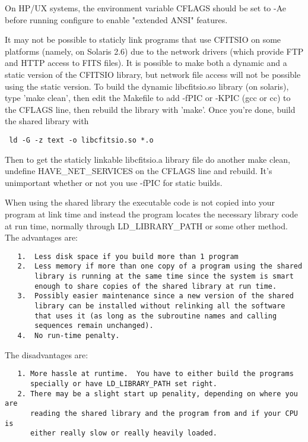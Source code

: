 \documentclass[11pt]{book}
\begin{document}
On HP/UX systems, the environment variable CFLAGS should be set
to -Ae before running configure to enable "extended ANSI" features.

It may not be possible to staticly link programs that use CFITSIO on
some platforms (namely, on Solaris 2.6) due to the network drivers
(which provide FTP and HTTP access to FITS files).  It is possible to
make both a dynamic and a static version of the CFITSIO library, but
network file access will not be possible using the static version.  To
build the dynamic libcfitsio.so library (on solaris), type 'make
clean', then edit the Makefile to add -fPIC or -KPIC (gcc or cc) to the
CFLAGS line, then rebuild the library with 'make'.  Once you're done,
build the shared library with

\begin{verbatim}
 ld -G -z text -o libcfitsio.so *.o
\end{verbatim}
Then to get the staticly linkable libcfitsio.a library file do another
make clean, undefine HAVE\_NET\_SERVICES on the CFLAGS line and rebuild.
It's unimportant whether or not you use -fPIC for static builds.

When using the shared library the executable code is not copied into
your program at link time and instead the program locates the necessary
library code at run time, normally through LD\_LIBRARY\_PATH or some
other method.  The advantages are:

\begin{verbatim}
   1.  Less disk space if you build more than 1 program
   2.  Less memory if more than one copy of a program using the shared
       library is running at the same time since the system is smart
       enough to share copies of the shared library at run time.
   3.  Possibly easier maintenance since a new version of the shared
       library can be installed without relinking all the software
       that uses it (as long as the subroutine names and calling
       sequences remain unchanged).
   4.  No run-time penalty.
\end{verbatim}
The disadvantages are:

\begin{verbatim}
   1. More hassle at runtime.  You have to either build the programs
      specially or have LD_LIBRARY_PATH set right.
   2. There may be a slight start up penality, depending on where you are
      reading the shared library and the program from and if your CPU is
      either really slow or really heavily loaded.
\end{verbatim}
\end{document}
